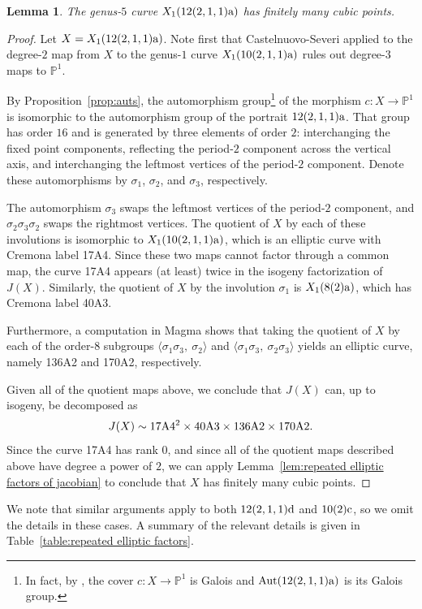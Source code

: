 \documentclass[12pt]{amsart}
\newtheorem{lem}[thm]{Lemma}
\theoremstyle{definition}
\newcommand{\bbP}{\mathbb{P}}
\newcommand{\Aut}{\operatorname{Aut}}
\numberwithin{equation}{section}
\begin{document}
\begin{lem}
    The genus-$5$ curve $X_1(\rm 12(2,1,1)a)$ has finitely many cubic points.
\end{lem}
\begin{proof}
    Let $X = X_1(\rm 12(2,1,1)a)$. Note first that Castelnuovo-Severi applied to the degree-$2$ map from $X$ to the genus-$1$ curve $X_1(\rm 10(2,1,1)a)$ rules out degree-$3$ maps to $\mathbb{P}^1$.
    
    By Proposition~\ref{prop:auts}, the automorphism group\footnote{In fact, by \cite[Remark 3.10]{doyle:2019}, the cover $c: X \to \bbP^1$ is Galois and $\Aut({\rm 12(2,1,1)a})$ is its Galois group.} of the morphism $c: X \to \mathbb{P}^1$ is isomorphic to the automorphism group of the portrait $\rm 12(2,1,1)a$. That group has order $16$ and is generated by three elements of order $2$: interchanging the fixed point components, reflecting the period-$2$ component across the vertical axis, and interchanging the leftmost vertices of the period-$2$ component. Denote these automorphisms by $\sigma_1$, $\sigma_2$, and $\sigma_3$, respectively.
    
    The automorphism $\sigma_3$ swaps the leftmost vertices of the period-$2$ component, and $\sigma_2\sigma_3\sigma_2$ swaps the rightmost vertices. The quotient of $X$ by each of these involutions is isomorphic to $X_1({\rm 10(2,1,1)a})$, which is an elliptic curve with Cremona label 17A4. Since these two maps cannot factor through a common map, the curve 17A4 appears (at least) twice in the isogeny factorization of $J(X)$.
    Similarly, the quotient of $X$ by the involution $\sigma_1$ is $X_1({\rm 8(2)a})$, which has Cremona label 40A3.

    Furthermore, a computation in Magma shows that taking the quotient of $X$ by each of the order-$8$ subgroups $\langle \sigma_1\sigma_3,\ \sigma_2\rangle$ and $\langle \sigma_1\sigma_3,\ \sigma_2\sigma_3\rangle$ yields an elliptic curve, namely 136A2 and 170A2, respectively.

    Given all of the quotient maps above, we conclude that $J(X)$ can, up to isogeny, be decomposed as
    \[
    J(X) \sim \rm 17A4^2 \times 40A3 \times 136A2 \times 170A2.
    \]
    Since the curve 17A4 has rank $0$, and since all of the quotient maps described above have degree a power of $2$, we can apply Lemma~\ref{lem:repeated elliptic factors of jacobian} to conclude that $X$ has finitely many cubic points.
\end{proof}

We note that similar arguments apply to both $\rm 12(2,1,1)d$ and $\rm 10(2)c$, so we omit the details in these cases. A summary of the relevant details is given in Table~\ref{table:repeated elliptic factors}.
\end{document}
